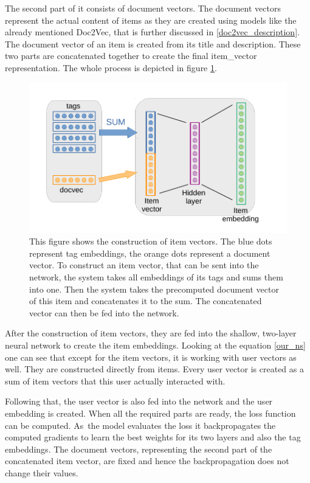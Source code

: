 The second part of it consists of document vectors. The document vectors represent the actual content of items as they are created using models like the already mentioned Doc2Vec, that is further discussed in \ref{doc2vec_description}. The document vector of an item is created from its title and description. These two parts are concatenated together to create the final item\_vector representation. The whole process is depicted in figure \ref{embed_construct}.

\begin{figure}[H]
    \centering
    \includegraphics{obrazky-figures/embeddings_construction.pdf}
    \caption{This figure shows the construction of item vectors. The blue dots represent tag embeddings, the orange dots represent a document vector. To construct an item vector, that can be sent into the network, the system takes all embeddings of its tags and sums them into one. Then the system takes the precomputed document vector of this item and concatenates it to the sum. The concatenated vector can then be fed into the network.}
    \label{embed_construct}
\end{figure}

After the construction of item vectors, they are fed into the shallow, two-layer neural network to create the item embeddings. Looking at the equation \ref{our_ns} one can see that except for the item vectors, it is working with user vectors as well. They are constructed directly from items. Every user vector is created as a sum of item vectors that this user actually interacted with.

Following that, the user vector is also fed into the network and the user embedding is created. When all the required parts are ready, the loss function can be computed. As~the model evaluates the loss it backpropagates the computed gradients to learn the best weights for its two layers and also the tag embeddings. The document vectors, representing the second part of the concatenated item vector, are fixed and hence the backpropagation does not change their values.

